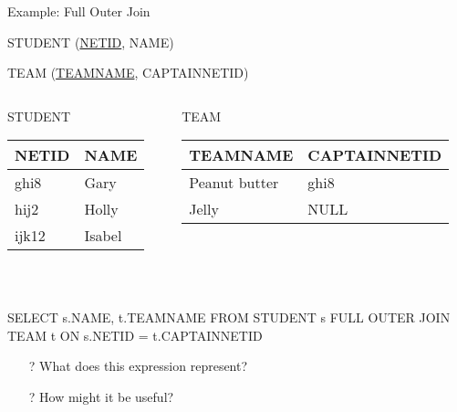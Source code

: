 \documentclass[aspectratio=169]{beamer}
\begin{document}
\begin{frame}[fragile]{Example: Full Outer Join}

STUDENT (\underline{NETID}, NAME)

TEAM (\underline{TEAMNAME}, CAPTAINNETID)


\begin{columns}[T]
\begin{column}{0.4\textwidth}
STUDENT\\
\begin{tabular}{|l|l|} \hline
\textbf{NETID} & NAME  \\ \hline
ghi8 & Gary  \\\hline
hij2 & Holly \\\hline
 ijk12 & Isabel  \\ \hline
\end{tabular}\\
\end{column}
\begin{column}{0.4\textwidth}

TEAM\\
\begin{tabular}{|l|l|} \hline
\textbf{TEAMNAME} & CAPTAINNETID  \\ \hline
Peanut butter & ghi8  \\\hline
Jelly & NULL \\\hline
\end{tabular}\\
\end{column}
\end{columns}

\begin{SQL}
SELECT s.NAME, t.TEAMNAME
FROM STUDENT s FULL OUTER JOIN TEAM t ON s.NETID = t.CAPTAINNETID
\end{SQL}
\begin{itemize}
\item[?] What does this expression represent?
\item[?] How might it be useful?
\end{itemize}


%
%
\end{frame}
\end{document}
